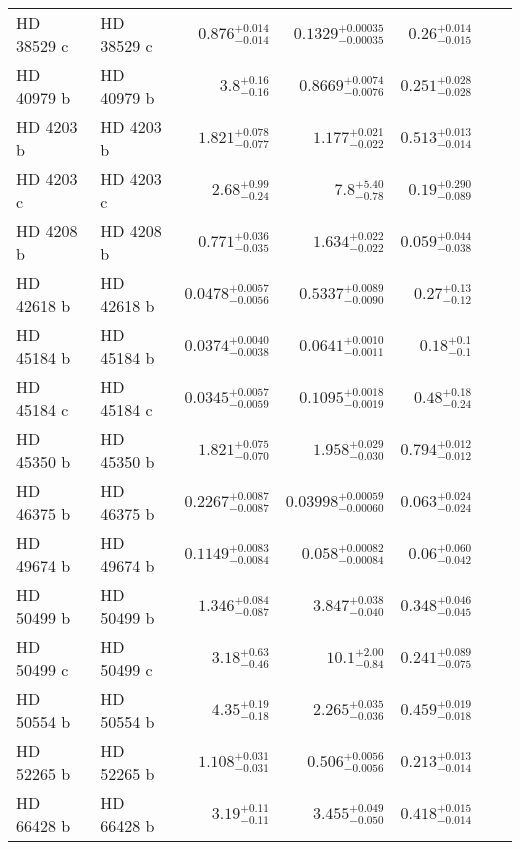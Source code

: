 \begin{longtable*}{llrrrrr}
HD 38529 c & HD 38529 c & $0.876^{+0.014}_{-0.014}$ & $0.1329^{+0.00035}_{-0.00035}$ & $0.26^{+0.014}_{-0.015}$ & \cite{Butler06} & \\
HD 40979 b & HD 40979 b & $3.8^{+0.16}_{-0.16}$ & $0.8669^{+0.0074}_{-0.0076}$ & $0.251^{+0.028}_{-0.028}$ & \cite{Butler06} & \\
HD 4203 b & HD 4203 b & $1.821^{+0.078}_{-0.077}$ & $1.177^{+0.021}_{-0.022}$ & $0.513^{+0.013}_{-0.014}$ & \cite{Vogt02} & \\
HD 4203 c & HD 4203 c & $2.68^{+0.99}_{-0.24}$ & $7.8^{+5.40}_{-0.78}$ & $0.19^{+0.290}_{-0.089}$ & \cite{Kane14} & \\
HD 4208 b & HD 4208 b & $0.771^{+0.036}_{-0.035}$ & $1.634^{+0.022}_{-0.022}$ & $0.059^{+0.044}_{-0.038}$ & \cite{Vogt02} & \\
HD 42618 b & HD 42618 b & $0.0478^{+0.0057}_{-0.0056}$ & $0.5337^{+0.0089}_{-0.0090}$ & $0.27^{+0.13}_{-0.12}$ & \cite{Fulton16} & \\
HD 45184 b & HD 45184 b & $0.0374^{+0.0040}_{-0.0038}$ & $0.0641^{+0.0010}_{-0.0011}$ & $0.18^{+0.1}_{-0.1}$ & \cite{Udry19} & \\
HD 45184 c & HD 45184 c & $0.0345^{+0.0057}_{-0.0059}$ & $0.1095^{+0.0018}_{-0.0019}$ & $0.48^{+0.18}_{-0.24}$ & \cite{Udry19} & \\
HD 45350 b & HD 45350 b & $1.821^{+0.075}_{-0.070}$ & $1.958^{+0.029}_{-0.030}$ & $0.794^{+0.012}_{-0.012}$ & \cite{Marcy05} & \\
HD 46375 b & HD 46375 b & $0.2267^{+0.0087}_{-0.0087}$ & $0.03998^{+0.00059}_{-0.00060}$ & $0.063^{+0.024}_{-0.024}$ & \cite{Marcy00} & \\
HD 49674 b & HD 49674 b & $0.1149^{+0.0083}_{-0.0084}$ & $0.058^{+0.00082}_{-0.00084}$ & $0.06^{+0.060}_{-0.042}$ & \cite{Butler03} & \\
HD 50499 b & HD 50499 b & $1.346^{+0.084}_{-0.087}$ & $3.847^{+0.038}_{-0.040}$ & $0.348^{+0.046}_{-0.045}$ & \cite{Vogt05} & \\
HD 50499 c & HD 50499 c & $3.18^{+0.63}_{-0.46}$ & $10.1^{+2.00}_{-0.84}$ & $0.241^{+0.089}_{-0.075}$ & \cite{Rickman19} & \\
HD 50554 b & HD 50554 b & $4.35^{+0.19}_{-0.18}$ & $2.265^{+0.035}_{-0.036}$ & $0.459^{+0.019}_{-0.018}$ & \cite{Fischer02} & \\
HD 52265 b & HD 52265 b & $1.108^{+0.031}_{-0.031}$ & $0.506^{+0.0056}_{-0.0056}$ & $0.213^{+0.013}_{-0.014}$ & \cite{Butler00} & \\
HD 66428 b & HD 66428 b & $3.19^{+0.11}_{-0.11}$ & $3.455^{+0.049}_{-0.050}$ & $0.418^{+0.015}_{-0.014}$ & \cite{Butler06} & \\

\end{longtable*}
